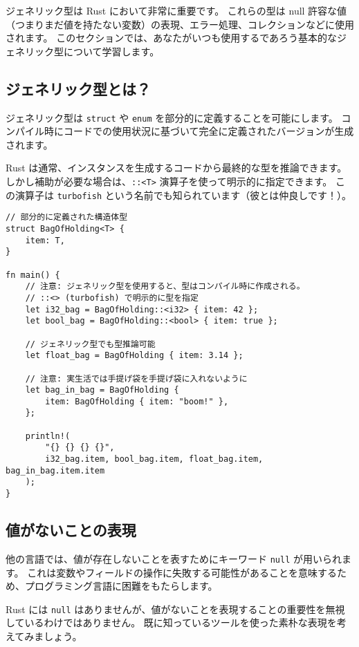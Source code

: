 ジェネリック型は Rust において非常に重要です。 これらの型は null
許容な値（つまりまだ値を持たない変数）の表現、エラー処理、コレクションなどに使用されます。
このセクションでは、あなたがいつも使用するであろう基本的なジェネリック型について学習します。

\subsection{ジェネリック型とは？}

ジェネリック型は \texttt{struct} や \texttt{enum}
を部分的に定義することを可能にします。
コンパイル時にコードでの使用状況に基づいて完全に定義されたバージョンが生成されます。

Rust は通常、インスタンスを生成するコードから最終的な型を推論できます。
しかし補助が必要な場合は、\texttt{::\textless{}T\textgreater{}}
演算子を使って明示的に指定できます。 この演算子は \texttt{turbofish}
という名前でも知られています（彼とは仲良しです！）。

\begin{verbatim}
// 部分的に定義された構造体型
struct BagOfHolding<T> {
    item: T,
}

fn main() {
    // 注意: ジェネリック型を使用すると、型はコンパイル時に作成される。
    // ::<> (turbofish) で明示的に型を指定
    let i32_bag = BagOfHolding::<i32> { item: 42 };
    let bool_bag = BagOfHolding::<bool> { item: true };

    // ジェネリック型でも型推論可能
    let float_bag = BagOfHolding { item: 3.14 };

    // 注意: 実生活では手提げ袋を手提げ袋に入れないように
    let bag_in_bag = BagOfHolding {
        item: BagOfHolding { item: "boom!" },
    };

    println!(
        "{} {} {} {}",
        i32_bag.item, bool_bag.item, float_bag.item, bag_in_bag.item.item
    );
}
\end{verbatim}

\subsection{値がないことの表現}

他の言語では、値が存在しないことを表すためにキーワード \texttt{null}
が用いられます。
これは変数やフィールドの操作に失敗する可能性があることを意味するため、プログラミング言語に困難をもたらします。

Rust には \texttt{null}
はありませんが、値がないことを表現することの重要性を無視しているわけではありません。
既に知っているツールを使った素朴な表現を考えてみましょう。


